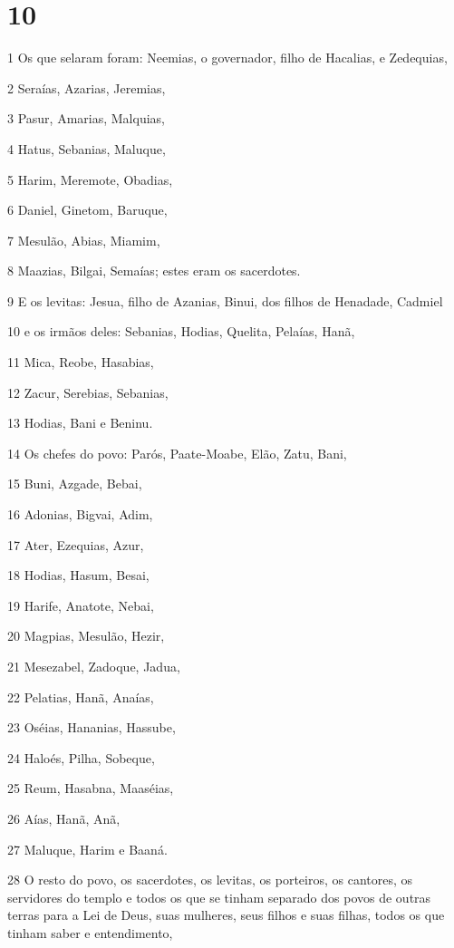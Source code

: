 \chapter{10}

\par 1 Os que selaram foram: Neemias, o governador, filho de Hacalias, e Zedequias,
\par 2 Seraías, Azarias, Jeremias,
\par 3 Pasur, Amarias, Malquias,
\par 4 Hatus, Sebanias, Maluque,
\par 5 Harim, Meremote, Obadias,
\par 6 Daniel, Ginetom, Baruque,
\par 7 Mesulão, Abias, Miamim,
\par 8 Maazias, Bilgai, Semaías; estes eram os sacerdotes.
\par 9 E os levitas: Jesua, filho de Azanias, Binui, dos filhos de Henadade, Cadmiel
\par 10 e os irmãos deles: Sebanias, Hodias, Quelita, Pelaías, Hanã,
\par 11 Mica, Reobe, Hasabias,
\par 12 Zacur, Serebias, Sebanias,
\par 13 Hodias, Bani e Beninu.
\par 14 Os chefes do povo: Parós, Paate-Moabe, Elão, Zatu, Bani,
\par 15 Buni, Azgade, Bebai,
\par 16 Adonias, Bigvai, Adim,
\par 17 Ater, Ezequias, Azur,
\par 18 Hodias, Hasum, Besai,
\par 19 Harife, Anatote, Nebai,
\par 20 Magpias, Mesulão, Hezir,
\par 21 Mesezabel, Zadoque, Jadua,
\par 22 Pelatias, Hanã, Anaías,
\par 23 Oséias, Hananias, Hassube,
\par 24 Haloés, Pilha, Sobeque,
\par 25 Reum, Hasabna, Maaséias,
\par 26 Aías, Hanã, Anã,
\par 27 Maluque, Harim e Baaná.
\par 28 O resto do povo, os sacerdotes, os levitas, os porteiros, os cantores, os servidores do templo e todos os que se tinham separado dos povos de outras terras para a Lei de Deus, suas mulheres, seus filhos e suas filhas, todos os que tinham saber e entendimento,
